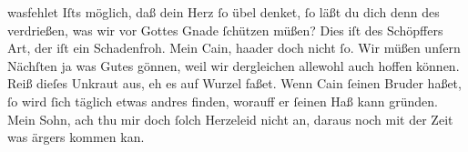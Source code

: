 \documentclass[tocstyle=ref-genre]{ees}
\begin{document}
{\begin{movement}{wasfehlet}
  \voice[Eva]
  Iſts möglich, daß dein Herz ſo übel denket,
  ſo läßt du dich denn des verdrießen,
  was wir vor Gottes Gnade ſchützen müßen?
  Dies iſt des Schöpffers Art, der iſt ein Schadenfroh.
  Mein Cain, haader doch nicht ſo.
  Wir müßen unſern Nächſten ja was Gutes gönnen,
  weil wir dergleichen allewohl auch hoffen können.
  Reiß dieſes Unkraut aus, eh es auf Wurzel faßet.
  Wenn Cain ſeinen Bruder haßet,
  ſo wird ſich täglich etwas andres finden,
  worauff er ſeinen Haß kann gründen.
  Mein Sohn, ach thu mir doch ſolch Herzeleid nicht an,
  daraus noch mit der Zeit was ärgers kommen kan.
\end{movement}






}

\eesScore
\end{document}
